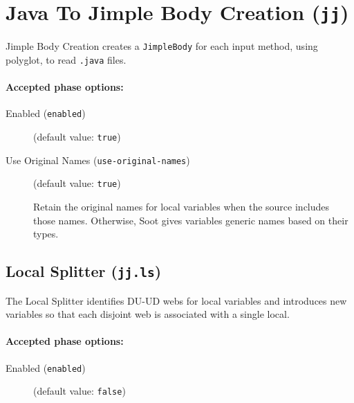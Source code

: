 \documentclass{article}
\begin{document}
\section{Java To Jimple Body Creation ({\tt jj})}

Jimple Body Creation creates a {\tt JimpleBody} for each input
method, using polyglot, to read {\tt .java} files.


\paragraph{Accepted phase options:} 

\begin{description}

\item[Enabled ({\tt enabled})]
(default value: {\tt true})






\item[Use Original Names ({\tt use-original-names})]
(default value: {\tt true})




Retain the original names for local variables when the source
includes those names.  Otherwise, Soot gives variables generic
names based on their types.



\end{description}

\subsection{Local Splitter ({\tt jj.ls})}

The Local Splitter identifies DU-UD webs for local variables and
introduces new variables so that each disjoint web is associated
with a single local.


\paragraph{Accepted phase options:} 

\begin{description}

\item[Enabled ({\tt enabled})]
(default value: {\tt false})






\end{description}
\end{document}
